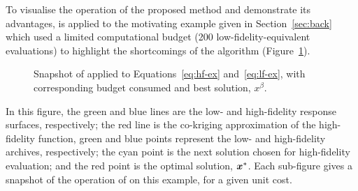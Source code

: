To visualise the operation of the proposed method and demonstrate its advantages, \AlgName{} is applied to the motivating example given in Section~\ref{sec:back} which used a limited computational budget (200 low-fidelity-equivalent evaluations) to highlight the shortcomings of the \motos{} algorithm (Figure~\ref{fig:ex-mfits}).
\begin{figure}[t]
  \centering
  \caption{Snapshot of \AlgName{} applied to Equations~\ref{eq:hf-ex} and~\ref{eq:lf-ex}, with corresponding budget consumed and best solution, $x^\beta$.} 
    \label{fig:ex-mfits}
\end{figure}
In this figure, the green and blue lines are the low- and high-fidelity response surfaces, respectively; the red line is the co-kriging approximation of the high-fidelity function, green and blue points represent the low- and high-fidelity archives, respectively; the cyan point is the next solution chosen for high-fidelity evaluation; and the red point is the optimal solution, $\boldsymbol{x}^*$. Each sub-figure gives a snapshot of the operation of \AlgName{} on this example, for a given unit cost.

